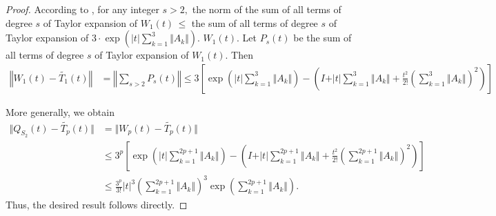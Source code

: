 \documentclass{article}
\theoremstyle{plain} %
\numberwithin{equation}{section}
\begin{document}
\begin{proof}
According to , for any integer $s>2,$ the norm of the sum of all terms of degree $s$ of Taylor expansion of $W_1(t)\, \leq$ the sum of all terms of degree $s$ of Taylor expansion of $\displaystyle 3\cdot \exp\left(\vert t\vert\sum_{k=1}^3\Vert A_k\Vert\right ).$ 
  $W_1(t).$ Let $P_s(t)$ be the sum of all terms of degree $s$ of Taylor expansion of $W_1(t)$. Then
	\begin{align*}
		\left\Vert W_1(t)-\widetilde{T_1}(t)\right\Vert &=\left\Vert \sum_{s>2} P_s(t)\right \Vert \leq 3\left[\exp \left(\vert t\vert \sum_{k=1}^3 \Vert A_k\Vert \right)-\left(I+\vert t\vert \sum_{k=1}^3 \Vert A_k\Vert+\frac{t^2}{2!}\left(\sum_{k=1}^3 \Vert A_k\Vert\right)^2 \right) \right]
	\end{align*}

    
More generally, we obtain 
\begin{align*}
\Vert Q_{S_2}(t)-\widetilde{T_p}(t)\Vert&=\Vert W_p(t)-\widetilde{T_p}(t)\Vert\\
&\leq 3^p\left[\exp \left(\vert t\vert \sum_{k=1}^{2p+1} \Vert A_k\Vert \right)-\left(I+\vert t\vert \sum_{k=1}^{2p+1} \Vert A_k\Vert+\frac{t^2}{2!}\left(\sum_{k=1}^{2p+1} \Vert A_k\Vert\right)^2 \right) \right]\\
&\leq \frac{3^p}{3!}\vert t\vert^3\left(\sum_{k=1}^{2p+1} \Vert A_k\Vert\right)^3\exp\left(\sum_{k=1}^{2p+1} \Vert A_k\Vert\right).
\end{align*}
Thus, the desired result follows directly.
\end{proof}
\end{document}
